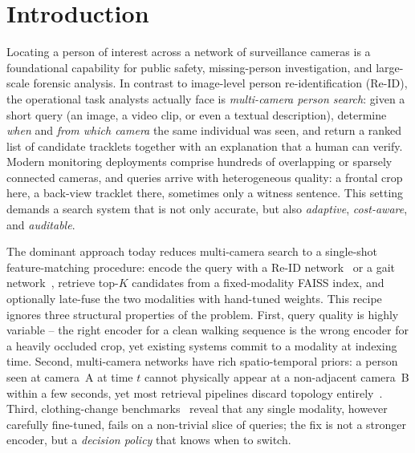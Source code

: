 \section{Introduction}
\label{sec:intro}

Locating a person of interest across a network of surveillance cameras is a
foundational capability for public safety, missing-person investigation,
and large-scale forensic analysis. In contrast to image-level person
re-identification (Re-ID), the operational task analysts actually face is
\emph{multi-camera person search}: given a short query (an image, a video
clip, or even a textual description), determine \emph{when} and \emph{from
which camera} the same individual was seen, and return a ranked list of
candidate tracklets together with an explanation that a human can verify.
Modern monitoring deployments comprise hundreds of overlapping or sparsely
connected cameras, and queries arrive with heterogeneous quality: a frontal
crop here, a back-view tracklet there, sometimes only a witness sentence.
This setting demands a search system that is not only accurate, but also
\emph{adaptive}, \emph{cost-aware}, and \emph{auditable}.

The dominant approach today reduces multi-camera search to a single-shot
feature-matching procedure: encode the query with a Re-ID
network~\cite{he2021transreid,li2023clipreid} or a gait
network~\cite{chao2019gaitset,fan2023opengait}, retrieve top-$K$ candidates
from a fixed-modality FAISS index, and optionally late-fuse the two
modalities with hand-tuned weights. This recipe ignores three structural
properties of the problem. First, query quality is highly variable -- the
right encoder for a clean walking sequence is the wrong encoder for a
heavily occluded crop, yet existing systems commit to a modality at
indexing time. Second, multi-camera networks have rich spatio-temporal
priors: a person seen at camera~A at time $t$ cannot physically appear at
a non-adjacent camera~B within a few seconds, yet most retrieval pipelines
discard topology entirely~\cite{davila2023mevid,zheng2017prw}. Third,
clothing-change benchmarks~\cite{yang2019prcc,qian2020ltcc} reveal that any
single modality, however carefully fine-tuned, fails on a non-trivial slice
of queries; the fix is not a stronger encoder, but a \emph{decision
policy} that knows when to switch.

